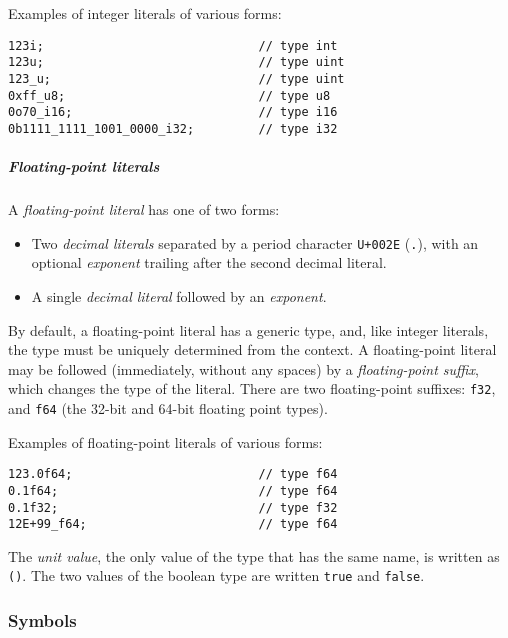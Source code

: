 \documentclass[]{article}
\begin{document}
Examples of integer literals of various forms:

\begin{verbatim}
123i;                              // type int
123u;                              // type uint
123_u;                             // type uint
0xff_u8;                           // type u8
0o70_i16;                          // type i16
0b1111_1111_1001_0000_i32;         // type i32
\end{verbatim}

\subparagraph{Floating-point literals}\label{floating-point-literals}

A \emph{floating-point literal} has one of two forms:

\begin{itemize}
\itemsep1pt\parskip0pt
\item
  Two \emph{decimal literals} separated by a period character
  \texttt{U+002E} (\texttt{.}), with an optional \emph{exponent}
  trailing after the second decimal literal.
\item
  A single \emph{decimal literal} followed by an \emph{exponent}.
\end{itemize}

By default, a floating-point literal has a generic type, and, like
integer literals, the type must be uniquely determined from the context.
A floating-point literal may be followed (immediately, without any
spaces) by a \emph{floating-point suffix}, which changes the type of the
literal. There are two floating-point suffixes: \texttt{f32}, and
\texttt{f64} (the 32-bit and 64-bit floating point types).

Examples of floating-point literals of various forms:

\begin{verbatim}
123.0f64;                          // type f64
0.1f64;                            // type f64
0.1f32;                            // type f32
12E+99_f64;                        // type f64
\end{verbatim}


The \emph{unit value}, the only value of the type that has the same
name, is written as \texttt{()}. The two values of the boolean type are
written \texttt{true} and \texttt{false}.

\subsubsection{Symbols}\label{symbols}
\end{document}
